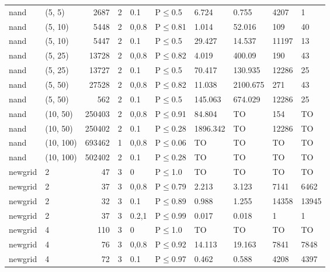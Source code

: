 \begin{longtable}{llrrllllll}
 nand          & (5, 5)    &   	2687 &   2 & 0.1   & P$\leq$0.5   & 6.724    & 0.755    & 4207    & 1       \\
 nand          & (5, 10)   &   	5448 &   2 & 0,0.8 & P$\leq$0.81  & 1.014    & 52.016   & 109     & 40      \\
 nand          & (5, 10)   &   	5447 &   2 & 0.1   & P$\leq$0.5   & 29.427   & 14.537   & 11197   & 13      \\
 nand          & (5, 25)   &  	13728 &   2 & 0,0.8 & P$\leq$0.82  & 4.019    & 400.09   & 190     & 43      \\
 nand          & (5, 25)   &  	13727 &   2 & 0.1   & P$\leq$0.5   & 70.417   & 130.935  & 12286   & 25      \\
 nand          & (5, 50)   &  	27528 &   2 & 0,0.8 & P$\leq$0.82  & 11.038   & 2100.675 & 271     & 43      \\
 nand          & (5, 50)   &    	562 &   2 & 0.1   & P$\leq$0.5   & 145.063  & 674.029  & 12286   & 25      \\
 nand          & (10, 50)  & 	250403 &   2 & 0,0.8 & P$\leq$0.91  & 84.804   & TO       & 154     & TO      \\
 nand          & (10, 50)  & 	250402 &   2 & 0.1   & P$\leq$0.28  & 1896.342 & TO       & 12286   & TO      \\
 nand          & (10, 100) & 	693462 &   1 & 0,0.8 & P$\leq$0.06  & TO       & TO       & TO      & TO      \\
 nand          & (10, 100) & 	502402 &   2 & 0.1   & P$\leq$0.28  & TO       & TO       & TO      & TO      \\
 newgrid       & 2         &     	47 &   3 & 0     & P$\leq$1.0   & TO       & TO       & TO      & TO      \\
 newgrid       & 2         &     	37 &   3 & 0,0.8 & P$\leq$0.79  & 2.213    & 3.123    & 7141    & 6462    \\
 newgrid       & 2         &     	32 &   3 & 0.1   & P$\leq$0.89  & 0.988    & 1.255    & 14358   & 13945   \\
 newgrid       & 2         &     	37 &   3 & 0.2,1 & P$\leq$0.99  & 0.017    & 0.018    & 1       & 1       \\
 newgrid       & 4         &    	110 &   3 & 0     & P$\leq$1.0   & TO       & TO       & TO      & TO      \\
 newgrid       & 4         &     	76 &   3 & 0,0.8 & P$\leq$0.92  & 14.113   & 19.163   & 7841    & 7848    \\
 newgrid       & 4         &     	72 &   3 & 0.1   & P$\leq$0.97  & 0.462    & 0.588    & 4208    & 4397    \\

\end{longtable}
